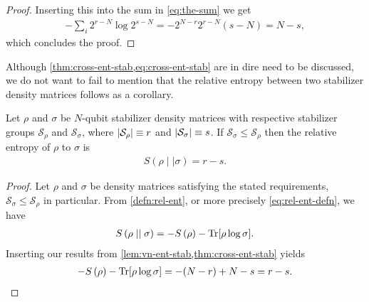 \begin{proof}
   Inserting this into the sum in \cref{eq:the-sum} we get
   \begin{align}
      -\sum_i 2^{r-N} \log 2^{s-N} =
      -2^{N-r}2^{r-N}\left(s-N\right)= N-s
   ,\end{align}
   which concludes the proof.
\end{proof}

Although \cref{thm:cross-ent-stab,eq:cross-ent-stab} are in dire need to be
discussed, we do not want to fail to mention that the relative entropy between
two stabilizer density matrices follows as a corollary.

\begin{cor}\label{col:rel-ent-stab}
  Let $\rho$ and $\sigma$ be $N$-qubit stabilizer density matrices with
  respective stabilizer groups $\mathcal{S}_\rho$ and $\mathcal{S}_\sigma$,
  where $\abs{\mathcal{S}_\rho}
  \equiv r$ and $\abs{\mathcal{S}_\sigma} \equiv s$. If $\mathcal{S}_\sigma \leq
  \mathcal{S}_\rho$ then the relative entropy of $\rho$ to
  $\sigma$ is
  \begin{align}
    S\left(\rho\mid\mid\sigma\right) = r - s
  .\end{align}
\end{cor}

\begin{proof}
  Let $\rho$ and $\sigma$ be density matrices satisfying the stated
  requirements, $\mathcal{S}_\sigma \leq \mathcal{S}_\rho$ in particular. From \cref{defn:rel-ent},
  or more precisely \cref{eq:rel-ent-defn}, we have
  \begin{align}
    S\left( \rho\mid\mid\sigma \right) = -S\left( \rho \right)
    -\Tr[\rho\log\sigma]
  .\end{align}
  Inserting our results from \cref{lem:vn-ent-stab,thm:cross-ent-stab} yields
  \begin{align}
    -S\left( \rho \right) -\Tr[\rho\log\sigma] = -(N-r) + N - s = r - s
  .\end{align}
\end{proof}

